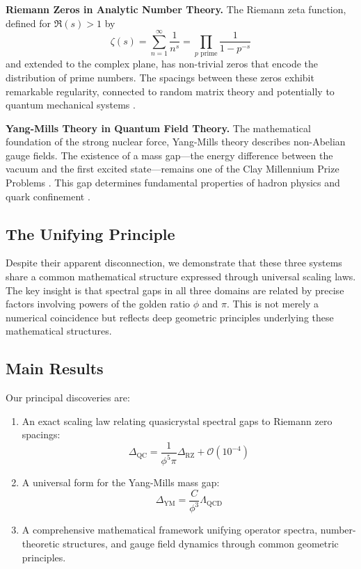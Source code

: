 \documentclass[12pt]{article}
\newcommand{\QC}{\text{QC}}
\newcommand{\RZ}{\text{RZ}}
\newcommand{\YM}{\text{YM}}
\begin{document}
\textbf{Riemann Zeros in Analytic Number Theory.} The Riemann zeta function, defined for $\Re(s) > 1$ by
\begin{equation}
\zeta(s) = \sum_{n=1}^{\infty} \frac{1}{n^s} = \prod_{p \text{ prime}} \frac{1}{1-p^{-s}}
\end{equation}
and extended to the complex plane, has non-trivial zeros that encode the distribution of prime numbers. The spacings between these zeros exhibit remarkable regularity, connected to random matrix theory \cite{montgomery1973,odlyzko1987} and potentially to quantum mechanical systems \cite{berry1999}.

\textbf{Yang-Mills Theory in Quantum Field Theory.} The mathematical foundation of the strong nuclear force, Yang-Mills theory describes non-Abelian gauge fields. The existence of a mass gap—the energy difference between the vacuum and the first excited state—remains one of the Clay Millennium Prize Problems \cite{jaffe2000}. This gap determines fundamental properties of hadron physics and quark confinement \cite{gross2005}.

\subsection{The Unifying Principle}

Despite their apparent disconnection, we demonstrate that these three systems share a common mathematical structure expressed through universal scaling laws. The key insight is that spectral gaps in all three domains are related by precise factors involving powers of the golden ratio $\phi$ and $\pi$. This is not merely a numerical coincidence but reflects deep geometric principles underlying these mathematical structures.

\subsection{Main Results}

Our principal discoveries are:

\begin{enumerate}
\item An exact scaling law relating quasicrystal spectral gaps to Riemann zero spacings:
\begin{equation}
\Delta_{\QC} = \frac{1}{\phi^5 \pi} \Delta_{\RZ} + \mathcal{O}(10^{-4})
\end{equation}

\item A universal form for the Yang-Mills mass gap:
\begin{equation}
\Delta_{\YM} = \frac{C}{\phi^3} \Lambda_{\text{QCD}}
\end{equation}

\item A comprehensive mathematical framework unifying operator spectra, number-theoretic structures, and gauge field dynamics through common geometric principles.
\end{enumerate}
\end{document}
